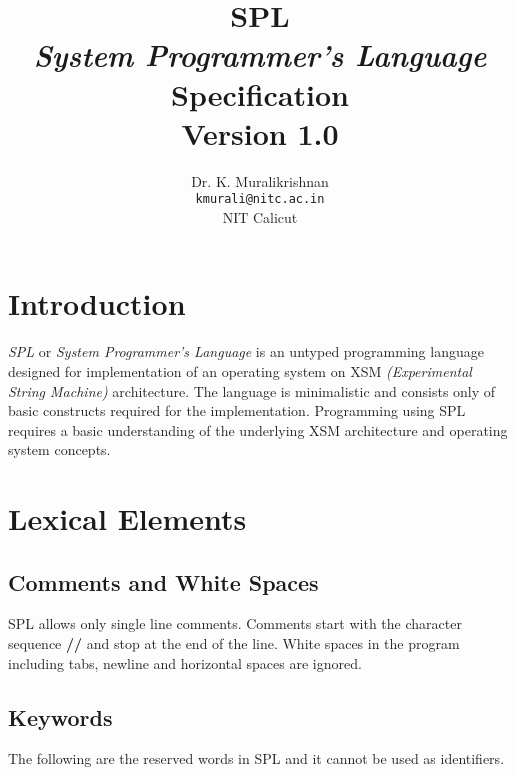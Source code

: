 \documentclass[11pt]{article}
\title{SPL \\ \textit{System Programmer's Language} \\ Specification \\
Version 1.0}
\author{Dr. K. Muralikrishnan  \\ \texttt{kmurali@nitc.ac.in} \\ {NIT Calicut} }
\begin{document}
 \newcommand{\kw}[1]{\texttt{#1}}

\maketitle

\pagebreak
\thispagestyle{plain}

\tableofcontents
\pagebreak


\section{Introduction}
\paragraph{}
\textit{SPL} or \textit{System Programmer’s Language} is an untyped programming language designed for implementation of an operating system on XSM \textit{(Experimental String Machine)} architecture. The language is minimalistic and consists only of basic constructs required for the implementation. Programming using SPL requires a basic understanding of the underlying XSM architecture and operating system concepts.




\section{Lexical Elements}




\subsection{Comments and White Spaces}

SPL allows only single line comments. Comments start with the character sequence \textbf{//} and stop at the end of the line. White spaces in the program including tabs, newline and horizontal spaces are ignored.


\subsection{Keywords}
The following are the reserved words in SPL and it cannot be used as identifiers.
\end{document}
